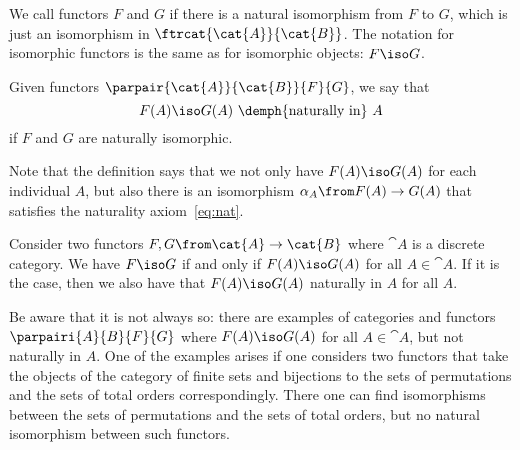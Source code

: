 \begin{defn}
  We call functors $F$ and $G$  if there is a
  natural isomorphism from $F$ to $G$, which is just an isomorphism in
  $\ftrcat{\cat{A}}{\cat{B}}$. The notation for isomorphic functors is the same
  as for isomorphic objects: $F \iso G$.
\end{defn}

\begin{defn}
  Given functors $\parpair{\cat{A}}{\cat{B}}{F}{G}$, we say that
  \[
  F(A) \iso G(A) \text{ \demph{naturally in} } A
  \]
  if $F$ and $G$ are naturally isomorphic.
\end{defn}

Note that the definition says that we not only have $F(A) \iso G(A)$ for each
individual $A$, but also there is an isomorphism $\alpha_A\from F(A) \to G(A)$
that satisfies the naturality axiom~\eqref{eq:nat}.

\begin{exmp}
  Consider two functors $F, G\from \cat{A} \to \cat{B}$ where $\cat{A}$ is a
  discrete category. We have $F \iso G$ if and only if $F(A) \iso G(A)$ for all
  $A \in \cat{A}$. If it is the case, then we also have that $F(A) \iso G(A)$
  naturally in $A$ for all $A$.

  Be aware that it is not always so: there are examples of categories and
  functors $\parpairi{A}{B}{F}{G}$ where $F(A) \iso G(A)$ for all $A \in
  \cat{A}$, but not naturally in $A$. One of the examples arises if one
  considers two functors that take the objects of the category of finite sets
  and bijections to the sets of permutations and the sets of total orders
  correspondingly.  There one can find isomorphisms between the sets of
  permutations and the sets of total orders, but no natural isomorphism between
  such functors.
\end{exmp}

